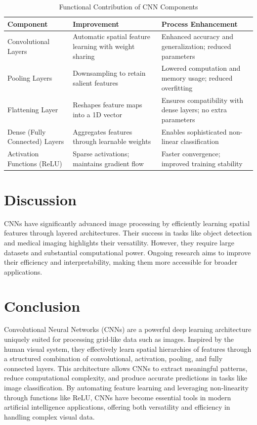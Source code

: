 \documentclass[12pt]{article}
\begin{document}
\begin{table}[htbp]
  \centering
  \caption{Functional Contribution of CNN Components}
  \label{tab:functionalContribution}
  \begin{tabular}{p{3.5cm} p{4.5cm} p{4.5cm}}
    \hline
    \textbf{Component} & \textbf{Improvement} & \textbf{Process Enhancement} \\
    \hline
    Convolutional Layers 
      & Automatic spatial feature learning with weight sharing 
      & Enhanced accuracy and generalization; reduced parameters \\
    Pooling Layers 
      & Downsampling to retain salient features 
      & Lowered computation and memory usage; reduced overfitting \\
    Flattening Layer 
      & Reshapes feature maps into a 1D vector 
      & Ensures compatibility with dense layers; no extra parameters \\
    Dense (Fully Connected) Layers 
      & Aggregates features through learnable weights 
      & Enables sophisticated non-linear classification \\
    Activation Functions (ReLU)
      & Sparse activations; maintains gradient flow
      & Faster convergence; improved training stability \\
    \hline
  \end{tabular}
\end{table}

\section{Discussion}
CNNs have significantly advanced image processing by efficiently learning spatial features through layered architectures. Their success in tasks like object detection and medical imaging highlights their versatility. However, they require large datasets and substantial computational power. Ongoing research aims to improve their efficiency and interpretability, making them more accessible for broader applications.

\section{Conclusion}
Convolutional Neural Networks (CNNs) are a powerful deep learning architecture uniquely suited for processing grid‐like data such as images. Inspired by the human visual system, they effectively learn spatial hierarchies of features through a structured combination of convolutional, activation, pooling, and fully connected layers. This architecture allows CNNs to extract meaningful patterns, reduce computational complexity, and produce accurate predictions in tasks like image classification. By automating feature learning and leveraging non‐linearity through functions like ReLU, CNNs have become essential tools in modern artificial intelligence applications, offering both versatility and efficiency in handling complex visual data.
\end{document}

